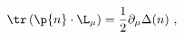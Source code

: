 \begin{equation}
  \label{eq:trDnL}
  \tr\left(\p{n}\cdot\L_\mu\right) = \frac{1}{2} \partial_\mu\Delta(n)\ ,
\end{equation}

